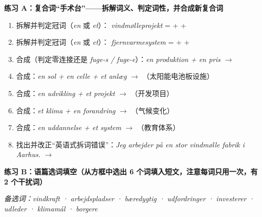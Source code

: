 \textbf{练习 A：复合词“手术台”——拆解词义、判定词性，并合成新复合词}
\begin{enumerate}
  \item 拆解并判定冠词（\textit{en} 或 \textit{et}）：\underline{\hspace{0.9cm}} \textit{vindmølleprojekt} = \underline{\hspace{1.8cm}} + \underline{\hspace{1.8cm}} + \underline{\hspace{1.8cm}}
  \item 拆解并判定冠词（\textit{en} 或 \textit{et}）：\underline{\hspace{0.9cm}} \textit{fjernvarmesystem} = \underline{\hspace{1.8cm}} + \underline{\hspace{1.8cm}} + \underline{\hspace{1.8cm}}
  \item 合成（判定零连接还是 \textit{fuge-s / fuge-e}）：\textit{en produktion + en pris} $\rightarrow$ \underline{\hspace{3.6cm}}
  \item 合成：\textit{en sol + en celle + et anlæg} $\rightarrow$ \underline{\hspace{3.6cm}}（太阳能电池板设施）
  \item 合成：\textit{en udvikling + et projekt} $\rightarrow$ \underline{\hspace{3.6cm}}（开发项目）
  \item 合成：\textit{et klima + en forandring} $\rightarrow$ \underline{\hspace{3.6cm}}（气候变化）
  \item 合成：\textit{en uddannelse + et system} $\rightarrow$ \underline{\hspace{3.6cm}}（教育体系）
  \item 找出并改正“英语式拆词错误”：\textit{Jeg arbejder på en stor vindmølle fabrik i Aarhus.} $\rightarrow$
\end{enumerate}

\textbf{练习 B：语篇选词填空（从方框中选出 6 个词填入短文，注意每词只用一次，有 2 个干扰词）}

\textit{备选词：vindkraft · arbejdspladser · bæredygtig · udfordringer · investerer · udleder · klimamål · borgere}

